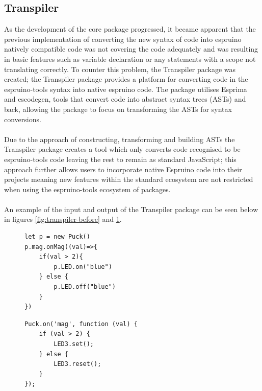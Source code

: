 \documentclass{l4proj}
\begin{document}
\subsection{Transpiler}
As the development of the core package progressed, it became apparent that the previous implementation of converting the new syntax of code into espruino natively compatible code was not covering the code adequately and was resulting in basic features such as variable declaration or any statements with a scope not translating correctly. To counter this problem, the Transpiler package was created; the Transpiler package provides a platform for converting code in the espruino-tools syntax into native espruino code. The package utilises Esprima and escodegen, tools that convert code into abstract syntax trees (ASTs) and back, allowing the package to focus on transforming the ASTs for syntax conversions.
\\ \\
Due to the approach of constructing, transforming and building ASTs the Transpiler package creates a tool which only converts code recognised to be espruino-tools code leaving the rest to remain as standard JavaScript; this approach further allows users to incorporate native Espruino code into their projects meaning new features within the standard ecosystem are not restricted when using the espruino-tools ecosystem of packages.
\\ \\ 
An example of the input and output of the Transpiler package can be seen below in figures \ref{fig:transpiler-before} and \ref{fig:transpiler-after}.

\begin{figure}[!ht]
\centering
\begin{minipage}{6cm}
  \centering
  \begin{lstlisting}
let p = new Puck()
p.mag.onMag((val)=>{
    if(val > 2){
        p.LED.on("blue")
    } else {
        p.LED.off("blue")
    }
})

  \end{lstlisting}
  
  \label{fig:transpiler-before}
\end{minipage}
\hspace{1cm}
\begin{minipage}{6cm}
  \centering
  
  \begin{lstlisting}
Puck.on('mag', function (val) {
    if (val > 2) {
        LED3.set();
    } else {
        LED3.reset();
    }
});
  \end{lstlisting}
  \label{fig:transpiler-after}
\end{minipage}
\end{figure}
\end{document}
